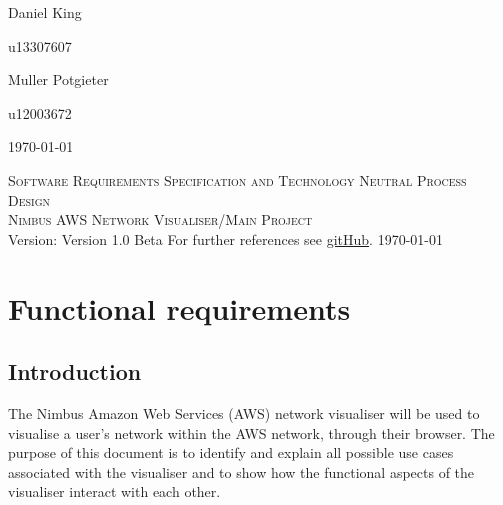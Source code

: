\documentclass[a4paper,12pt]{report}
\begin{document}
\begin{titlepage}
\begin{center}
\begin{minipage}{0.4\textwidth}
\begin{flushleft} \large
Daniel {King}
\end{flushleft}
\end{minipage}
\begin{minipage}{0.4\textwidth}
\begin{flushright} \large
\emph{}
u13307607
\end{flushright}
\end{minipage}

\begin{minipage}{0.4\textwidth}
\begin{flushleft} \large
Muller {Potgieter}
\end{flushleft}
\end{minipage}
\begin{minipage}{0.4\textwidth}
\begin{flushright} \large
\emph{}
u12003672
\end{flushright}
\end{minipage}

\vfill
{\large \today}
\end{center}
\end{titlepage}
\footnotesize
%
\normalsize

\renewcommand{\thesection}{\arabic{section}}
\newpage
\begin{center}
\textsc{\LARGE Software Requirements Specification and Technology Neutral Process Design}\\[1.5cm]
\textsc{\Large Nimbus AWS Network Visualiser/Main Project}\\[0.5cm]
Version: Version 1.0 Beta
For further references see \href{ https://github.com/u13133064/NotLikeThis}{gitHub}.
\today
\end{center}
\tableofcontents{}
\newpage
\section{Functional requirements}
\subsection{Introduction}
The Nimbus Amazon Web Services (AWS) network visualiser will be used to visualise a user's network within the AWS network, through their browser. The purpose of this document is to identify and explain all possible use cases associated with the visualiser and to show how the functional aspects of the visualiser interact with each other.
\end{document}
